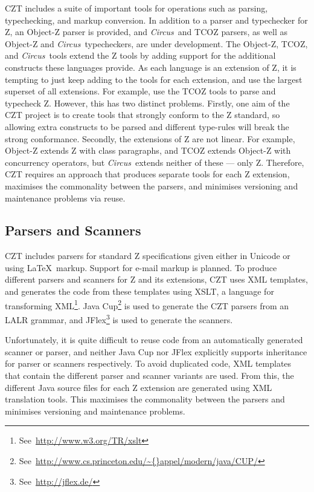 \documentclass{llncs}
\newcommand{\Circus}{{\sf\slshape Circus}}
\begin{document}
  CZT includes a suite of important tools for operations such as
  parsing, typechecking, and markup conversion. In addition to a
  parser and typechecker for Z, an Object-Z parser is provided, and
  \Circus\ and TCOZ parsers, as well as Object-Z and \Circus\
  typecheckers, are under development.  The Object-Z, TCOZ, and
  \Circus\ tools extend the Z tools by adding support for the
  additional constructs these languages provide.  As each language is an
  extension of Z, it is tempting to just keep adding to the tools
  for each extension, and use the largest superset of all
  extensions. For example, use the TCOZ tools to parse and typecheck
  Z. However, this has two distinct problems. Firstly, one aim of the
  CZT project is to create tools that strongly conform to the Z
  standard, so allowing extra constructs to be parsed and different
  type-rules will break the strong conformance. Secondly, the
  extensions of Z are not linear. For example, Object-Z extends Z with
  class paragraphs, and TCOZ extends Object-Z with concurrency
  operators, but \Circus\ extends neither of these --- only
  Z. Therefore, CZT requires an approach that produces separate tools
  for each Z extension, maximises the commonality between the parsers,
  and minimises versioning and maintenance problems via reuse.

\subsection{Parsers and Scanners}

  CZT includes parsers for standard Z specifications given either in
  Unicode or using \LaTeX\ markup.  Support for e-mail markup is
  planned. To produce different parsers and scanners for Z and its
  extensions, CZT uses XML templates, and generates the code from these
  templates using XSLT, a language for transforming XML\footnote{See~\url{http://www.w3.org/TR/xslt}}. Java
  Cup\footnote{See~\url{http://www.cs.princeton.edu/\~{}appel/modern/java/CUP/}} is
  used to generate the CZT parsers from an LALR grammar, and
  JFlex\footnote{See~\url{http://jflex.de/}} is used to generate the
  scanners.

  Unfortunately, it is quite difficult to reuse code from an
  automatically generated scanner or parser, and neither Java Cup nor
  JFlex explicitly supports inheritance for parser or scanners
  respectively.  To avoid duplicated code, XML templates that contain
  the different parser and scanner variants are used. From this, the
  different Java source files for each Z extension are generated using
  XML translation tools.  This maximises the commonality between the
  parsers and minimises versioning and maintenance problems.
\end{document}
